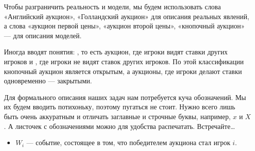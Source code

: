 Чтобы разграничить реальность и модели, мы будем использовать слова «Английский аукцион», «Голландский аукцион» для описания реальных явлений, а слова «аукцион первой цены», «аукцион второй цены», «кнопочный аукцион» — для описания моделей.

Иногда вводят понятия: , то есть аукцион, где игроки видят ставки других игроков и , где игроки не видят ставок других игроков. По этой классификации кнопочный аукцион является открытым, а аукционы, где игроки делают ставки одновременно — закрытыми.

Для формального описания наших задач нам потребуется куча обозначений. Мы их будем вводить потихоньку, поэтому пугаться не стоит. Нужно всего лишь быть очень аккуратным и отличать заглавные и строчные буквы, например, $x$ и $X$. А листочек с обозначениями можно для удобства распечатать. Встречайте\ldots

\newpage

\begin{center}
\end{center}

\begin{itemize}
\item $W_{i}$ — событие, состоящее в том, что победителем аукциона стал игрок $ i $.
\end{itemize}


